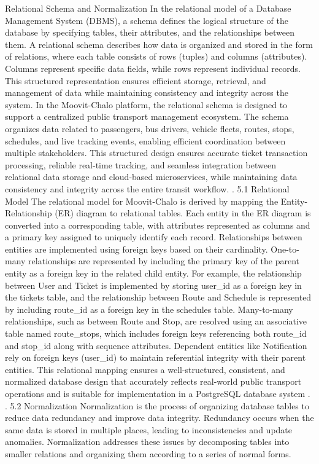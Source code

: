 Relational Schema and Normalization
In the relational model of a Database Management System (DBMS), a schema defines the logical structure of the database by specifying tables, their attributes, and the relationships between them. A relational schema describes how data is organized and stored in the form of relations, where each table consists of rows (tuples) and columns (attributes). Columns represent specific data fields, while rows represent individual records. This structured representation ensures efficient storage, retrieval, and management of data while maintaining consistency and integrity across the system.
In the Moovit-Chalo platform, the relational schema is designed to support a centralized public transport management ecosystem. The schema organizes data related to passengers, bus drivers, vehicle fleets, routes, stops, schedules, and live tracking events, enabling efficient coordination between multiple stakeholders. This structured design ensures accurate ticket transaction processing, reliable real-time tracking, and seamless integration between relational data storage and cloud-based microservices, while maintaining data consistency and integrity across the entire transit workflow.
.
5.1 Relational Model
          The relational model for Moovit-Chalo is derived by mapping the Entity-Relationship (ER) diagram to relational tables. Each entity in the ER diagram is converted into a corresponding table, with attributes represented as columns and a primary key assigned to uniquely identify each record. Relationships between entities are implemented using foreign keys based on their cardinality.
One-to-many relationships are represented by including the primary key of the parent entity as a foreign key in the related child entity. For example, the relationship between User and Ticket is implemented by storing user_id as a foreign key in the tickets table, and the relationship between Route and Schedule is represented by including route_id as a foreign key in the schedules table. Many-to-many relationships, such as between Route and Stop, are resolved using an associative table named route_stops, which includes foreign keys referencing both route_id and stop_id along with sequence attributes. Dependent entities like Notification rely on foreign keys (user_id) to maintain referential integrity with their parent entities. This relational mapping ensures a well-structured, consistent, and normalized database design that accurately reflects real-world public transport operations and is suitable for implementation in a PostgreSQL database system
.
.
5.2 Normalization
Normalization is the process of organizing database tables to reduce data redundancy and improve data integrity. Redundancy occurs when the same data is stored in multiple places, leading to inconsistencies and update anomalies. Normalization addresses these issues by decomposing tables into smaller relations and organizing them according to a series of normal forms.

